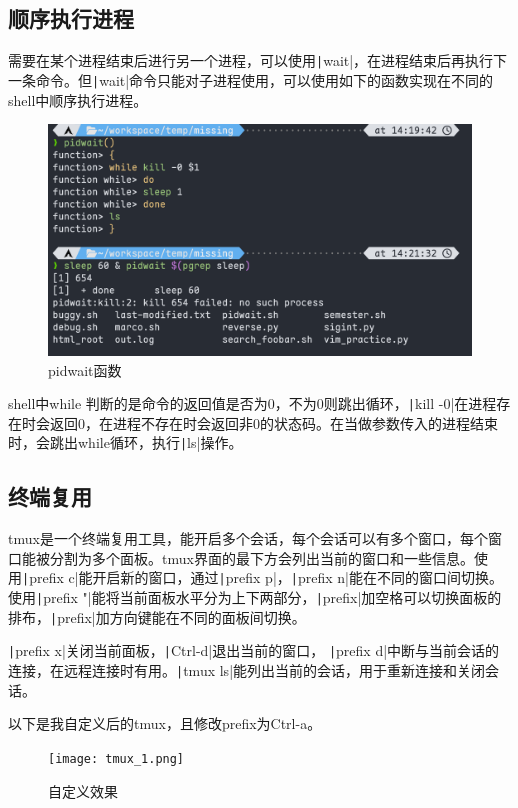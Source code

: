 \documentclass[fontset=ubuntu]{ctexart}
\begin{document}
\subsection{顺序执行进程}
需要在某个进程结束后进行另一个进程，可以使用\texttt|wait|，在进程结束后再执行下一条命令。但\texttt|wait|命令只能对子进程使用，可以使用如下的函数实现在不同的shell中顺序执行进程。
\begin{figure}[htb]
    \centering
    \includegraphics[width=0.75\linewidth]{pidwait_1.png}
    \caption{pidwait函数}
    \label{fig:pidwait_1}
\end{figure}

shell中while 判断的是命令的返回值是否为0，不为0则跳出循环，\texttt|kill -0|在进程存在时会返回0，在进程不存在时会返回非0的状态码。在当做参数传入的进程结束时，会跳出while循环，执行\texttt|ls|操作。

\subsection{终端复用}
tmux是一个终端复用工具，能开启多个会话，每个会话可以有多个窗口，每个窗口能被分割为多个面板。tmux界面的最下方会列出当前的窗口和一些信息。使用\texttt|prefix c|能开启新的窗口，通过\texttt|prefix p|，\texttt|prefix n|能在不同的窗口间切换。使用\texttt|prefix "|能将当前面板水平分为上下两部分，\texttt|prefix|加空格可以切换面板的排布，\texttt|prefix|加方向键能在不同的面板间切换。

\texttt|prefix x|关闭当前面板，\texttt|Ctrl-d|退出当前的窗口，
\texttt|prefix d|中断与当前会话的连接，在远程连接时有用。\texttt|tmux ls|能列出当前的会话，用于重新连接和关闭会话。

以下是我自定义后的tmux，且修改prefix为Ctrl-a。
\begin{figure}[htb]
    \centering
    \texttt{[image: tmux\_1.png]}
    \caption{自定义效果}
    \label{fig:tmux_1}
\end{figure}
\end{document}
